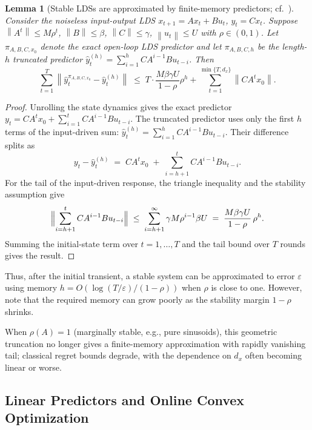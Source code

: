 \documentclass[11pt]{article}
\theoremstyle{plain}
\newtheorem{lemma}[theorem]{Lemma}
\theoremstyle{definition}
\theoremstyle{remark}
\newcommand{\norm}[1]{\left\lVert#1\right\rVert}
\begin{document}
\begin{lemma}[Stable LDSs are approximated by finite-memory predictors; cf.\ {\citealp[Lemma~9.6]{hazan2025onlinecontrol}}]
\label{lem:stable-truncation}
Consider the noiseless input-output LDS $x_{t+1} = A x_t + B u_t$, $y_t = C x_t$. Suppose $\norm{A^t} \leq M \rho^t$, $\norm{B} \leq \beta$, $\norm{C} \leq \gamma$, $\norm{u_t} \leq U$ with $\rho \in (0, 1)$. Let $\pi_{A,B,C,x_0}$ denote the exact open-loop LDS predictor and let $\pi_{A,B,C,h}$ be the length-$h$ truncated predictor $\hat y_t^{(h)} = \sum_{i=1}^{h} CA^{i-1}B u_{t-i}$. Then
\begin{equation}
    \sum_{t=1}^{T} \norm{\hat y_t^{\pi_{A,B,C,x_0}} - \hat y_t^{(h)}} \;\leq\; T \cdot \frac{M \beta \gamma U}{1 - \rho} \rho^h + \sum_{t=1}^{\min\{T, d_x\}} \norm{C A^t x_0}.
    \label{eq:stable-truncation}
\end{equation}
\end{lemma}

\begin{proof}
Unrolling the state dynamics gives the exact predictor $y_t = C A^t x_0 + \sum_{i=1}^{t} C A^{i-1} B u_{t-i}$. The truncated predictor uses only the first $h$ terms of the input-driven sum: $\hat y_t^{(h)} = \sum_{i=1}^{h} C A^{i-1} B u_{t-i}$. Their difference splits as
\[
    y_t - \hat y_t^{(h)} \;=\; C A^t x_0 \;+\; \sum_{i=h+1}^{t} C A^{i-1} B u_{t-i}.
\]
For the tail of the input-driven response, the triangle inequality and the stability assumption give
\[
    \Bigl\lVert \sum_{i=h+1}^{t} C A^{i-1} B u_{t-i} \Bigr\rVert \;\leq\; \sum_{i=h+1}^{\infty} \gamma M \rho^{i-1} \beta U \;=\; \frac{M \beta \gamma U}{1 - \rho}\, \rho^h.
\]
Summing the initial-state term over $t = 1, \ldots, T$ and the tail bound over $T$ rounds gives the result.
\end{proof}

Thus, after the initial transient, a stable system can be approximated to error $\varepsilon$ using memory $h = O(\log(T/\varepsilon)/(1 - \rho))$ when $\rho$ is close to one. However, note that the required memory can grow poorly as the stability margin $1 - \rho$ shrinks.

When $\rho(A) = 1$ (marginally stable, e.g., pure sinusoids), this geometric truncation no longer gives a finite-memory approximation with rapidly vanishing tail; classical regret bounds degrade, with the dependence on $d_x$ often becoming linear or worse.

\subsection{Linear Predictors and Online Convex Optimization}
\label{sec:linear-predictors}
\end{document}
